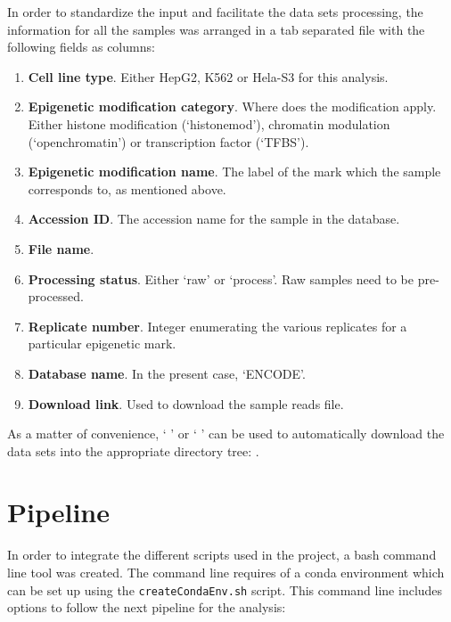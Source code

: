 \medskip

In order to standardize the input and facilitate the data sets processing, the information for all the samples was arranged in a tab separated file with the following fields as columns:

\begin{enumerate}
    \item \textbf{Cell line type}. Either HepG2, K562 or Hela-S3 for this analysis.
    \item \textbf{Epigenetic modification category}. Where does the modification apply. Either histone modification (`histonemod'), chromatin modulation (`openchromatin') or transcription factor (`TFBS').
    \item \textbf{Epigenetic modification name}. The label of the mark which the sample corresponds to, as mentioned above.
    \item \textbf{Accession ID}. The accession name for the sample in the database.
    \item \textbf{File name}.
    \item \textbf{Processing status}. Either `raw' or `process'. Raw samples need to be pre-processed.
    \item \textbf{Replicate number}. Integer enumerating the various replicates for a particular epigenetic mark.
    \item \textbf{Database name}. In the present case, `ENCODE'.
    \item \textbf{Download link}. Used to download the sample reads file.
\end{enumerate}

As a matter of convenience, ` ' or `   ' can be used to automatically download the data sets into the appropriate directory tree: .


\section{Pipeline}

In order to integrate the different scripts used in the project, a bash command line tool was created. The command line requires of a conda environment which can be set up using the \texttt{createCondaEnv.sh} script. This command line includes options to follow the next pipeline for the analysis:

